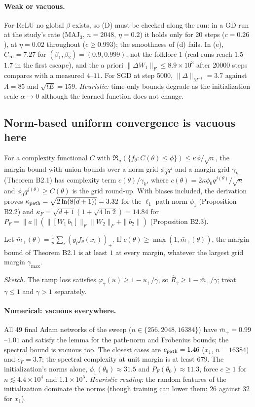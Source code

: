 \paragraph{Weak or vacuous.} For ReLU no global $\beta$ exists, so (D) must be checked along the run: in a GD run at the study's rate (MAJ$_3$, $n=2048$, $\eta=0.2$) it holds only for 20 steps ($c=0.26$), at $\eta=0.02$ throughout ($c\ge0.993$); the smoothness of (d) fails. In (e), $C_\infty=7.27$ for $(\beta_1,\beta_2)=(0.9,0.999)$, not the folklore $1$ (real runs reach $1.5$--$1.7$ in the first escape), and the a priori $\|\Delta W_1\|_F\le8.9\times10^3$ after 20000 steps compares with a measured $4$--$11$. For SGD at step 5000, $\|\Delta\|_{M^{-1}}=3.7$ against $\Lambda=85$ and $\sqrt{tE}=159$. \emph{Heuristic:} time-only bounds degrade as the initialization scale $\alpha\to0$ although the learned function does not change.

\subsection{Norm-based uniform convergence is vacuous here}\label{app:networks:norms}

For a complexity functional $C$ with $\mathfrak R_n(\{f_\theta:C(\theta)\le\phi\})\le\kappa\phi/\sqrt n$, the margin bound with union bounds over a norm grid $\phi_0q^j$ and a margin grid $\gamma_k$ (Theorem B2.1) has complexity term $c(\theta)/\gamma_k$, where $c(\theta)=2\kappa\phi_0q^{j(\theta)}/\sqrt n$ and $\phi_0q^{j(\theta)}\ge C(\theta)$ is the grid round-up. With biases included, the derivation proves $\kappa_{\rm path}=\sqrt{2\ln(8(d+1))}=3.32$ for the $\ell_1$ path norm $\phi_1$ (Proposition B2.2) and $\kappa_F=\sqrt{d+1}(1+\sqrt{4\ln2})=14.84$ for $P_F=\|a\|(\|[W_1\,b_1]\|_F\|W_2\|_F+\|b_2\|)$ (Proposition B2.3).

\begin{lemma}[Lemma B2.1a]\label{lem:B21a}
Let $\bar m_+(\theta)=\frac1n\sum_i(y_if_\theta(x_i))_+$. If $c(\theta)\ge\max(1,\bar m_+(\theta))$, the margin bound of Theorem B2.1 is at least $1$ at every margin, whatever the largest grid margin $\gamma_{\max}$.
\end{lemma}
\noindent\emph{Sketch.} The ramp loss satisfies $\varphi_\gamma(u)\ge1-u_+/\gamma$, so $\hat R_\gamma\ge1-\bar m_+/\gamma$; treat $\gamma\le1$ and $\gamma>1$ separately.

\paragraph{Numerical: vacuous everywhere.} All 49 final Adam networks of the sweep ($n\in\{256,2048,16384\}$) have $\bar m_+=0.99$--$1.01$ and satisfy the lemma for the path-norm and Frobenius bounds; the spectral bound is vacuous too. The closest cases are $c_{\rm path}=1.46$ ($x_1$, $n=16384$) and $c_F=3.7$; the spectral complexity at unit margin is at least $679$. The initialization's norms alone, $\phi_1(\theta_0)\approx31.5$ and $P_F(\theta_0)\approx11.3$, force $c\ge1$ for $n\lesssim4.4\times10^4$ and $1.1\times10^5$. \emph{Heuristic reading:} the random features of the initialization dominate the norms (though training can lower them: $26$ against $32$ for $x_1$).

